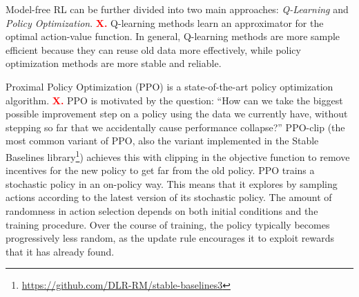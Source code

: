 \documentclass[a4paper]{article}
\begin{document}
Model-free RL can be further divided into two main approaches: \emph{Q-Learning} and \emph{Policy Optimization}.
\textbf{\textcolor{red}{X.}}
Q-learning methods learn an approximator for the optimal action-value function.
In general, Q-learning methods are more sample efficient because they can reuse old data more effectively, while policy optimization methods are more stable and reliable.

Proximal Policy Optimization (PPO) \cite{schulman2017proximal} is a state-of-the-art policy optimization algorithm.
\textbf{\textcolor{red}{X.}}
PPO is motivated by the question: ``How can we take the biggest possible improvement step on a policy using the data we currently have, without stepping so far that we accidentally cause performance collapse?''
PPO-clip (the most common variant of PPO, also the variant implemented in the Stable Baselines library\footnote{\url{https://github.com/DLR-RM/stable-baselines3}}) achieves this with clipping in the objective function to remove incentives for the new policy to get far from the old policy.
PPO trains a stochastic policy in an on-policy way.
This means that it explores by sampling actions according to the latest version of its stochastic policy.
The amount of randomness in action selection depends on both initial conditions and the training procedure.
Over the course of training, the policy typically becomes progressively less random, as the update rule encourages it to exploit rewards that it has already found.
\end{document}
